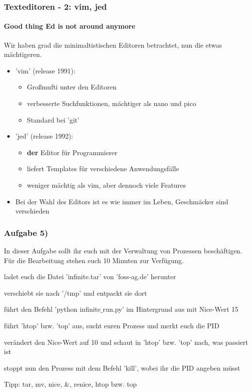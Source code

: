 \documentclass[12pt,utf8, handout]{beamer}
\begin{document}
\begin{frame}
\frametitle{Texteditoren - 2: vim, jed}
\framesubtitle{\textcolor{ownDarkOr}{Good thing Ed is not around anymore}}
Wir haben grad die minimaltistischen Editoren betrachtet, nun die etwas mächtigeren.
\begin{itemize}
	\item 'vim' (release 1991):
	\begin{itemize}[<+->]
		\item Großmufti unter den Editoren
		\item verbesserte Suchfunktionen, mächtiger als nano und pico
		\item Standard bei 'git'
	\end{itemize}
	\item 'jed' (release 1992):
	\begin{itemize}[<+->]
		\item \textbf{der} Editor für Programmierer
		\item liefert Templates für verschiedene Anwendungsfälle
		\item weniger mächtig als vim, aber dennoch viele Features
	\end{itemize}
	\item Bei der Wahl des Editors ist es wie immer im Leben, Geschmäcker sind verschieden
\end{itemize}
\end{frame}

\begin{frame}
\frametitle{Aufgabe 5)}
In dieser Aufgabe sollt ihr euch mit der Verwaltung von Prozessen beschäftigen.
Für die Bearbeitung stehen euch 10 Minuten zur Verfügung.
\begin{itemize}
	{\footnotesize
	\item ladet euch die Datei 'infinite.tar' von 'foss-ag.de' herunter
	\item verschiebt sie nach '/tmp' und entpackt sie dort
	\item führt den Befehl 'python infinite$\_$run.py' im Hintergrund aus mit Nice-Wert 15
	\item führt 'htop' bzw. 'top' aus, sucht euren Prozess und merkt euch die PID
	\item verändert den Nice-Wert auf 10 und schaut in 'htop' bzw. 'top' nach, was passiert ist
	\item stoppt nun den Prozess mit dem Befehl 'kill', wobei ihr die PID angeben müsst
	}
\end{itemize}
{\scriptsize Tipp: tar, mv, nice, \&, renice, htop bzw. top}
\end{frame}
\end{document}

